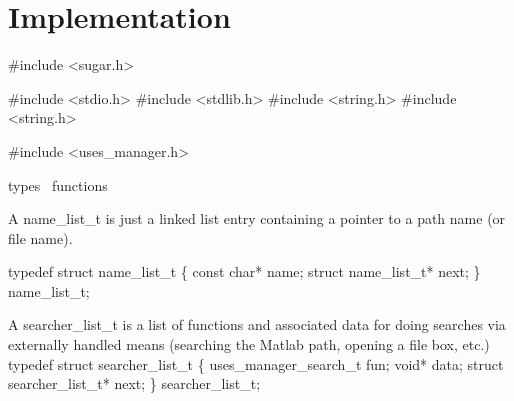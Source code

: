 \section{Implementation}

\nwenddocs{}\endmoddef\nwstartdeflinemarkup\nwenddeflinemarkup
#include <sugar.h>

#include <stdio.h>
#include <stdlib.h>
#include <string.h>
#include <string.h>

#include <uses_manager.h>

\LA{}types~{\nwtagstyle{}}\RA{}
\LA{}functions~{\nwtagstyle{}}\RA{}
\nwendcode{}\nwdocspar

A {\Tt{}name{\_}list{\_}t\nwendquote} is just a linked list entry containing a pointer
to a path name (or file name).

\nwenddocs{}\endmoddef\nwstartdeflinemarkup{}\nwenddeflinemarkup
typedef struct name_list_t \{
    const char* name;
    struct name_list_t* next;
\} name_list_t;

\nwendcode{}\nwdocspar

A {\Tt{}searcher{\_}list{\_}t\nwendquote} is a list of functions and associated data
for doing searches via externally handled means (searching the Matlab
path, opening a file box, etc.)
\nwenddocs{}\plusendmoddef\nwstartdeflinemarkup{}\nwenddeflinemarkup
typedef struct searcher_list_t \{
    uses_manager_search_t fun;
    void* data;
    struct searcher_list_t* next;
\} searcher_list_t;

\nwendcode{}\nwdocspar

